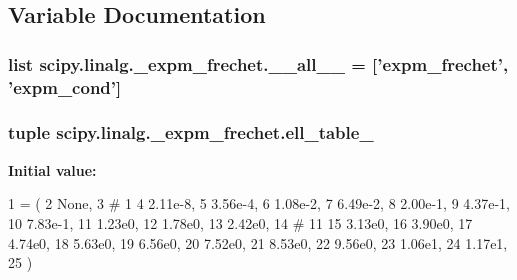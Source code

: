 \subsection{Variable Documentation}
\hypertarget{namespacescipy_1_1linalg_1_1__expm__frechet_ad3291740dbebb68237cef47cb64523d4}{}
\subsubsection[{\+\_\+\+\_\+all\+\_\+\+\_\+}]{\setlength{\rightskip}{0pt plus 5cm}list scipy.\+linalg.\+\_\+expm\+\_\+frechet.\+\_\+\+\_\+all\+\_\+\+\_\+ = \mbox{[}'{\bf expm\+\_\+frechet}', '{\bf expm\+\_\+cond}'\mbox{]}}\label{namespacescipy_1_1linalg_1_1__expm__frechet_ad3291740dbebb68237cef47cb64523d4}
\hypertarget{namespacescipy_1_1linalg_1_1__expm__frechet_abd59cd447a91a9c851001c0d511783b9}{}
\subsubsection[{ell\+\_\+table\+\_\+61}]{\setlength{\rightskip}{0pt plus 5cm}tuple scipy.\+linalg.\+\_\+expm\+\_\+frechet.\+ell\+\_\+table\+\_}\label{namespacescipy_1_1linalg_1_1__expm__frechet_abd59cd447a91a9c851001c0d511783b9}
{\bfseries Initial value\+:}
\begin{DoxyCode}
1 = (
2         \textcolor{keywordtype}{None},
3         \textcolor{comment}{# 1}
4         2.11e-8,
5         3.56e-4,
6         1.08e-2,
7         6.49e-2,
8         2.00e-1,
9         4.37e-1,
10         7.83e-1,
11         1.23e0,
12         1.78e0,
13         2.42e0,
14         \textcolor{comment}{# 11}
15         3.13e0,
16         3.90e0,
17         4.74e0,
18         5.63e0,
19         6.56e0,
20         7.52e0,
21         8.53e0,
22         9.56e0,
23         1.06e1,
24         1.17e1,
25         )
\end{DoxyCode}
